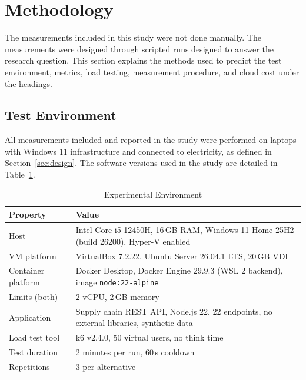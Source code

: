 \documentclass[conference,a4paper]{IEEEtran}
\begin{document}
\section{Methodology}
\label{sec:methodology}

The measurements included in this study were not done manually. The measurements were designed through scripted runs designed to answer the research question. This section explains the methods used to predict the test environment, metrics, load testing, measurement procedure, and cloud cost under the headings.

\subsection{Test Environment}
All measurements included and reported in the study were performed on laptops with Windows 11 infrastructure and connected to electricity, as defined in Section~\ref{sec:design}. The software versions used in the study are detailed in Table~\ref{tab:environment}.

\begin{table}[htbp]
	\caption{Experimental Environment}
	\label{tab:environment}
	\centering
	\footnotesize
	\begin{tabular}{|l|p{}|}
		\hline
		\textbf{Property} & \textbf{Value} \\
		\hline
		Host & Intel Core i5-12450H, 16\,GB RAM, Windows 11 Home 25H2 (build 26200), Hyper-V enabled \\
		\hline
		VM platform & VirtualBox 7.2.22, Ubuntu Server 26.04.1 LTS, 20\,GB VDI \\
		\hline
		Container platform & Docker Desktop, Docker Engine 29.9.3 (WSL 2 backend), image \texttt{node:22-alpine} \\
		\hline
		Limits (both) & 2 vCPU, 2\,GB memory \\
		\hline
		Application & Supply chain REST API, Node.js 22, 22 endpoints, no external libraries, synthetic data \\
		\hline
		Load test tool & k6 v2.4.0, 50 virtual users, no think time \\
		\hline
		Test duration & 2 minutes per run, 60\,s cooldown \\
		\hline
		Repetitions & 3 per alternative \\
		\hline
	\end{tabular}
\end{table}
\end{document}

